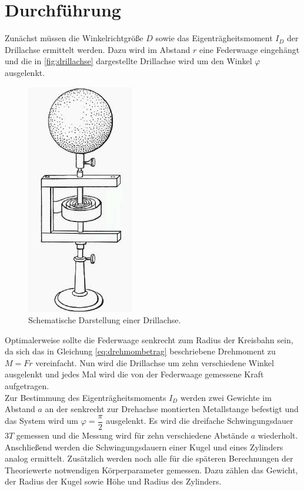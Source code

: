 \section{Durchführung}
\label{sec:Durchführung}
Zunächst müssen die Winkelrichtgröße $D$ sowie das Eigenträgheitsmoment $I_D$ der Drillachse ermittelt werden. Dazu wird im Abstand $r$ eine Federwaage eingehängt 
und die in \autoref{fig:drillachse} dargestellte Drillachse wird um den Winkel $\varphi$ ausgelenkt. 
\begin{figure}[H]
    \centering
    \includegraphics{Drillachse.pdf}
    \caption{Schematische Darstellung einer Drillachse\cite{ap05}.}
    \label{fig:drillachse}
\end{figure}
Optimalerweise sollte die Federwaage senkrecht zum Radius der Kreisbahn sein, da sich das in Gleichung \eqref{eq:drehmombetrag} beschriebene Drehmoment zu $M =F r$ vereinfacht.
Nun wird die Drillachse um zehn verschiedene Winkel ausgelenkt und jedes Mal wird die von der Federwaage gemessene Kraft aufgetragen. \\

Zur Bestimmung des Eigenträgheitsmoments $I_D$ werden zwei Gewichte im Abstand $a$ an der senkrecht zur Drehachse montierten Metallstange befestigt und das System wird um $\varphi = \dfrac{π}{2}$ ausgelenkt.
Es wird die dreifache Schwingungsdauer $3T$ gemessen und die Messung wird für zehn verschiedene Abstände $a$ wiederholt. \\

Anschließend werden die Schwingungsdauern einer Kugel und eines Zylinders analog ermittelt. Zusätzlich werden noch alle für die späteren Berechnungen der Theoriewerte notwendigen Körperparameter gemessen.
Dazu zählen das Gewicht, der Radius der Kugel sowie Höhe und Radius des Zylinders. \\

